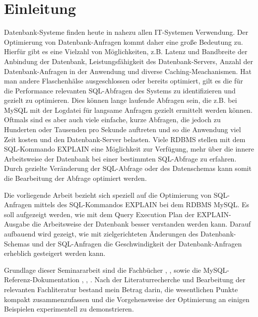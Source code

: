 \section{Einleitung}
Datenbank-Systeme finden heute in nahezu allen IT-Systemen Verwendung.
Der Optimierung von Datenbank-Anfragen kommt daher eine große Bedeutung zu.
Hierfür gibt es eine Vielzahl von Möglichkeiten, z.B. Latenz und Bandbreite der Anbindung der Datenbank, Leistungsfähigkeit des Datenbank-Servers, Anzahl der Datenbank-Anfragen in der Anwendung und diverse Caching-Meachanismen.
Hat man andere Flaschenhälse ausgeschlossen oder bereits optimiert,  gilt es die für die Performance relevanten SQL-Abfragen des Systems zu identifizieren und gezielt zu optimieren. Dies können lange laufende Abfragen sein, die z.B. bei MySQL mit der Logdatei für langsame Anfragen gezielt ermittelt werden können. Oftmals sind es aber auch viele einfache, kurze Abfragen, die jedoch zu Hunderten oder Tausenden pro Sekunde auftreten und so die Anwendung viel Zeit kosten und den Datenbank-Server belasten.
Viele RDBMS stellen mit dem SQL-Kommando EXPLAIN eine Möglichkeit zur Verfügung, mehr über die innere Arbeitsweise der Datenbank bei einer bestimmten SQL-Abfrage zu erfahren. Durch gezielte Veränderung der SQL-Abfrage oder des Datenschemas kann somit die Bearbeitung der Abfrage optimiert werden.

Die vorliegende Arbeit bezieht sich speziell auf die Optimierung von SQL-Anfragen mittels des SQL-Kommandos EXPLAIN bei dem RDBMS MySQL.
Es soll aufgezeigt werden, wie mit dem Query Execution Plan der EXPLAIN-Ausgabe die Arbeitsweise der Datenbank besser verstanden werden kann. Darauf aufbauend wird gezeigt, wie mit zielgerichteten Änderungen des Datenbank-Schemas und der SQL-Anfragen die Geschwindigkeit der Datenbank-Anfragen erheblich gesteigert werden kann.

Grundlage dieser Seminararbeit sind die Fachbücher \cite{Bradford2011}, \cite{Sauer1998}, \cite{Schwartz2009} sowie die MySQL-Referenz-Dokumentation \cite{refman1}, \cite{refman2}, \cite{refman3}.
Nach der Literaturrecherche und Bearbeitung der relevanten Fachliteratur bestand mein Betrag darin, die wesentlichen Punkte kompakt zusammenzufassen und die Vorgehensweise der Optimierung an einigen Beispielen experimentell zu demonstrieren.

